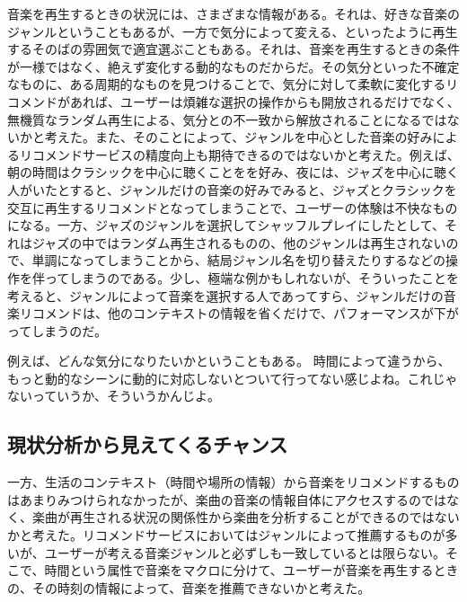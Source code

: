 \documentclass[11pt, twocolumn]{jsarticle}
\begin{document}
音楽を再生するときの状況には、さまざまな情報がある。それは、好きな音楽のジャンルということもあるが、一方で気分によって変える、といったように再生するそのばの雰囲気で適宜選ぶこともある。それは、音楽を再生するときの条件が一様ではなく、絶えず変化する動的なものだからだ。その気分といった不確定なものに、ある周期的なものを見つけることで、気分に対して柔軟に変化するリコメンドがあれば、ユーザーは煩雑な選択の操作からも開放されるだけでなく、無機質なランダム再生による、気分との不一致から解放されることになるではないかと考えた。また、そのことによって、ジャンルを中心とした音楽の好みによるリコメンドサービスの精度向上も期待できるのではないかと考えた。例えば、朝の時間はクラシックを中心に聴くことをを好み、夜には、ジャズを中心に聴く人がいたとすると、ジャンルだけの音楽の好みでみると、ジャズとクラシックを交互に再生するリコメンドとなってしまうことで、ユーザーの体験は不快なものになる。一方、ジャズのジャンルを選択してシャッフルプレイにしたとして、それはジャズの中ではランダム再生されるものの、他のジャンルは再生されないので、単調になってしまうことから、結局ジャンル名を切り替えたりするなどの操作を伴ってしまうのである。少し、極端な例かもしれないが、そういったことを考えると、ジャンルによって音楽を選択する人であってすら、ジャンルだけの音楽リコメンドは、他のコンテキストの情報を省くだけで、パフォーマンスが下がってしまうのだ。

例えば、どんな気分になりたいかということもある。
時間によって違うから、もっと動的なシーンに動的に対応しないとついて行ってない感じよね。これじゃないっていうか、そういうかんじよ。

\subsection{現状分析から見えてくるチャンス}
一方、生活のコンテキスト（時間や場所の情報）から音楽をリコメンドするものはあまりみつけられなかったが、楽曲の音楽の情報自体にアクセスするのではなく、楽曲が再生される状況の関係性から楽曲を分析することができるのではないかと考えた。リコメンドサービスにおいてはジャンルによって推薦するものが多いが、ユーザーが考える音楽ジャンルと必ずしも一致しているとは限らない。そこで、時間という属性で音楽をマクロに分けて、ユーザーが音楽を再生するときの、その時刻の情報によって、音楽を推薦できないかと考えた。
\end{document}
